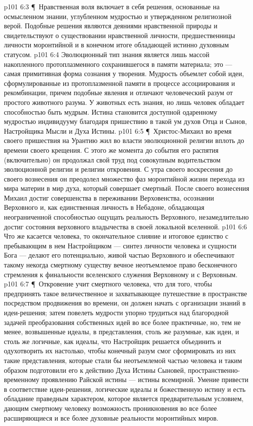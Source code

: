 \vs p101 6:3 \P\ Нравственная воля включает в себя решения, основанные на осмысленном знании, углубленном мудростью и утвержденном религиозной верой. Подобные решения являются деяниями нравственной природы и свидетельствуют о существовании нравственной личности, предшественницы личности моронтийной и в конечном итоге обладающей истинно духовным статусом.
\vs p101 6:4 Эволюционный тип знания является лишь массой накопленного протоплазменного сохранившегося в памяти материала; это --- самая примитивная форма сознания у творения. Мудрость объемлет собой идеи, сформулированные из протоплазменной памяти в процессе ассоциирования и рекомбинации, причем подобные явления и отличают человеческий разум от простого животного разума. У животных есть знания, но лишь человек обладает способностью быть мудрым. Истина становится доступной одаренному мудростью индивидууму благодаря пришествию в такой ум духов Отца и Сынов, Настройщика Мысли и Духа Истины.
\vs p101 6:5 \P\ Христос\hyp{}Михаил во время своего пришествия на Урантию жил во власти эволюционной религии вплоть до времени своего крещения. С этого же момента до события его распятия (включительно) он продолжал свой труд под совокупным водительством эволюционной религии и религии откровения. С утра своего воскресения до своего вознесения он преодолел множество фаз моронтийной жизни перехода из мира материи в мир духа, который совершает смертный. После своего вознесения Михаил достиг совершенства в переживании Верховенства, осознании Верховного и, как единственная личность в Небадоне, обладающая неограниченной способностью ощущать реальность Верховного, незамедлительно достиг состояния верховного владычества в своей локальной вселенной.
\vs p101 6:6 Что же касается человека, то окончательное слияние и итоговое единство с пребывающим в нем Настройщиком --- синтез личности человека и сущности Бога --- делают его потенциально, живой частью Верховного и обеспечивают такому некогда смертному существу вечное неотъемлемое право бесконечного стремления к финальности вселенского служения Верховному и с Верховным.
\vs p101 6:7 \P\ Откровение учит смертного человека, что для того, чтобы предпринять такое величественное и захватывающее путешествие в пространстве посредством продвижения во времени, он должен начать с организации знаний в идеи\hyp{}решения; затем повелеть мудрости упорно трудиться над благородной задачей преобразования собственных идей во все более практичные, но, тем не менее, возвышенные идеалы, в представления, столь же разумные, как идеи, и столь же логичные, как идеалы, что Настройщик решается объединить и одухотворить их настолько, чтобы конечный разум смог сформировать из них такие представления, которые стали бы неотъемлемой частью человека и таким образом подготовили его к действию Духа Истины Сыновей, пространственно\hyp{}временному проявлению Райской истины --- истины всемирной. Умение привести в соответствие идеи\hyp{}решения, логические идеалы и божественную истину и есть обладание праведным характером, которое является предварительным условием, дающим смертному человеку возможность проникновения во все более расширяющиеся и все более духовные реальности моронтийных миров.
